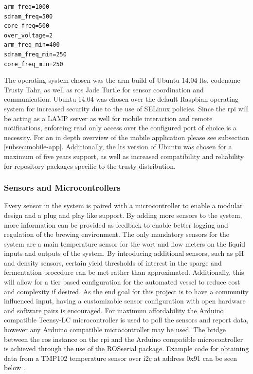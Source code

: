 \documentclass{article}
\begin{document}
\begin{lstlisting}
arm_freq=1000
sdram_freq=500
core_freq=500
over_voltage=2
arm_freq_min=400
sdram_freq_min=250
core_freq_min=250
\end{lstlisting}

The operating system chosen was the \gls{arm} build of Ubuntu 14.04 \gls{lts}, codename Trusty Tahr, as well as \gls{ros} Jade Turtle for sensor coordination and communication.  Ubuntu 14.04 was chosen over the default Raspbian operating system for increased security due to the use of SELinux policies.  Since the \gls{rpi} will be acting as a LAMP server as well for mobile interaction and remote notifications, enforcing read only access over the configured port of choice is a necessity. For an in depth overview of the mobile application please see subsection \ref{subsec:mobile-app}.  Additionally, the \gls{lts} version of Ubuntu was chosen for a maximum of five years support, as well as increased compatibility and reliability for repository packages specific to the trusty distribution.

\subsubsection{Sensors and Microcontrollers}\label{subsec:sensor}
Every sensor in the system is paired with a microcontroller to enable a modular design and a plug and play like support.  By adding more sensors to the system, more information can be provided as feedback to enable better logging and regulation of the brewing environment.  The only mandatory sensors for the system are a main temperature sensor for the \gls{wort} and flow meters on the liquid inputs and outputs of the system.  By introducing additional sensors, such as pH and density sensors, certain yield thresholds of interest in the \gls{sparge} and fermentation procedure can be met rather than approximated.  Additionally, this will allow for a tier based configuration for the automated vessel to reduce cost and complexity if desired.  As the end goal for this project is to have a community influenced input, having a customizable sensor configuration with open hardware and software pairs is encouraged.  For maximum affordability the Arduino compatible Teensy-LC microcontroller is used to poll the sensors and report data, however any Arduino compatible microcontroller may be used. The bridge between the \gls{ros} instance on the \gls{rpi} and the Arduino compatible microcontroller is achieved through the use of the ROSserial package.  Example code for obtaining data from a TMP102 temperature sensor over \gls{i2c} at address 0x91 \cite{tmp102} can be seen below \cite{rosserial}.
\end{document}
